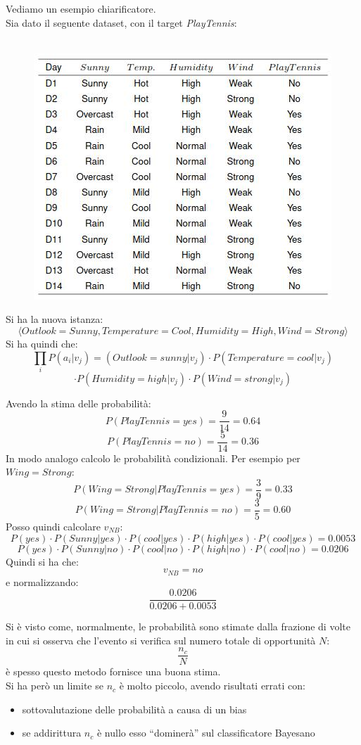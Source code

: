\documentclass[a4paper,12pt, oneside]{book}
\begin{document}
\begin{esempio}
  Vediamo un esempio chiarificatore.\\
  Sia dato il seguente dataset, con il target \textit{PlayTennis}:
  \begin{figure}[H]
    \centering
\    \includegraphics[scale = 0.7]{img/cbn.jpg}
  \end{figure}
  Si ha la nuova istanza:
  \[\langle Outlook=Sunny, Temperature=Cool, Humidity=High,
      Wind=Strong \rangle\]
  Si ha quindi che:
  \[\prod_iP(a_i|v_j)=(Outlook=sunny|v_j)\cdot
      P(Temperature=cool|v_j)\]\[\cdot P(Humidity=high|v_j)\cdot
      P(Wind=strong|v_j)\]
 
  Avendo la stima delle probabilità:
  \[P(PlayTennis=yes)=\frac{9}{14}=0.64\]
  \[P(PlayTennis=no)=\frac{5}{14}=0.36\]
  In modo analogo calcolo le probabilità condizionali. Per esempio per
  $Wing=Strong$:
  \[P(Wing=Strong|PlayTennis=yes)=\frac{3}{9}=0.33\]
  \[P(Wing=Strong|PlayTennis=no)=\frac{3}{5}=0.60\]
  Posso quindi calcolare $v_{NB}$:
  \[P(yes)\cdot P(Sunny|yes)\cdot P(cool|yes)\cdot P(high|yes)\cdot
    P(cool|yes)=0.0053\]
  \[P(yes)\cdot P(Sunny|no)\cdot P(cool|no)\cdot P(high|no)\cdot
    P(cool|no)=0.0206\]
  Quindi si ha che:
  \[v_{NB}=no\]
  e normalizzando:
  \[\frac{0.0206}{0.0206+0.0053}\]
\end{esempio}
Si è visto come, normalmente, le probabilità sono stimate dalla frazione di
volte in cui si osserva che l'evento si verifica sul numero totale di
opportunità $N$:
\[\frac{n_c}{N}\]
è spesso questo metodo fornisce una buona stima.\\
Si ha però un limite se $n_c$ è molto piccolo, avendo risultati errati con:
\begin{itemize}
  \item sottovalutazione delle probabilità a causa di un bias
  \item se addirittura $n_c$ è nullo esso ``dominerà'' sul classificatore
  Bayesano 
\end{itemize}
\end{document}
